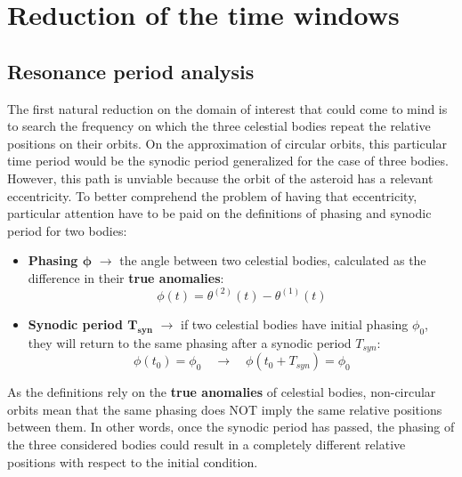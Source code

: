 \section{Reduction of the time windows}
\label{sec:time_red}

\subsection{Resonance period analysis}
\label{subsec:res_period}

The first natural reduction on the domain of interest that could come to mind is to search the frequency on which the three celestial bodies repeat the relative positions on their orbits. On the approximation of circular orbits, this particular time period would be the synodic period generalized for the case of three bodies.
However, this path is unviable because the orbit of the asteroid has a relevant eccentricity. To better comprehend the problem of having that eccentricity, particular attention have to be paid on the definitions of phasing and synodic period for two bodies:

\begin{itemize}
    [wide,itemsep=3pt,topsep=3pt]
    \item \textbf{Phasing $\bm{\phi}$} $\rightarrow$ the angle between two celestial bodies, calculated as the difference in their \textbf{true anomalies}:
    \vspace*{-8pt}
    \begin{equation}
        \phi (t) = \theta^{(2)} (t) - \theta^{(1)} (t)
    \end{equation}

    \item \textbf{Synodic period $\bm{T_{syn}}$} $\rightarrow$ if two celestial bodies have initial phasing $\phi_0$, they will return to the same phasing after a synodic period $T_{syn}$:
    \vspace*{-10pt}
    \begin{equation}
        \phi (t_0) = \phi_0 \quad \rightarrow \quad
        \phi (t_0 + T_{syn}) = \phi_0
    \end{equation}
\end{itemize}

As the definitions rely on the \textbf{true anomalies} of celestial bodies, non-circular orbits mean that the same phasing does NOT imply the same relative positions between them.
In other words, once the synodic period has passed, the phasing of the three considered bodies could result in a completely different relative positions with respect to the initial condition.

